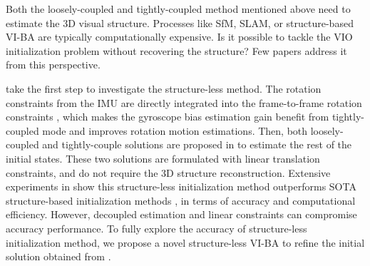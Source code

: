 Both the loosely-coupled and tightly-coupled method mentioned above need to estimate the 3D visual structure. Processes like SfM, SLAM, or structure-based VI-BA are typically computationally expensive. Is it possible to tackle the VIO initialization problem without recovering the structure? Few papers address it from this perspective.

\cite{he2023rotation} take the first step to investigate the structure-less method. The rotation constraints from the IMU \cite{forster2016manifold} are directly integrated into the frame-to-frame rotation constraints \cite{kneip2013direct}, which makes the gyroscope bias estimation gain benefit from tightly-coupled mode and improves rotation motion estimations. Then, both loosely-coupled and tightly-couple solutions are proposed in \cite{he2023rotation} to estimate the rest of the initial states. These two solutions are formulated with linear translation constraints, and do not require the 3D structure reconstruction. Extensive experiments in \cite{he2023rotation} show this structure-less initialization method outperforms SOTA structure-based initialization methods \cite{qin2018vins, geneva2022openvins}, in terms of accuracy and computational efficiency. However, decoupled estimation and linear constraints can compromise accuracy performance. To fully explore the accuracy of structure-less initialization method, we propose a novel structure-less VI-BA to refine the initial solution obtained from \cite{he2023rotation}.